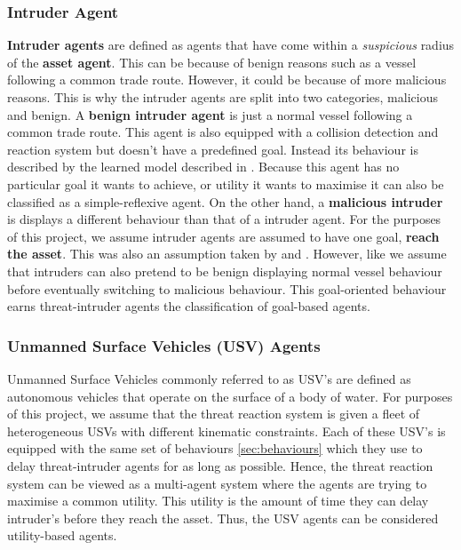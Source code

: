 \documentclass[bsc,frontabs,twoside,singlespacing,parskip,deptreport]{infthesis}     %
\begin{document}
\subsubsection{Intruder Agent}
\label{def:intruder}
\textbf{Intruder agents} are defined as agents that have come within a \textit{suspicious} radius of the \textbf{asset agent}. This can be because of benign reasons such as a vessel following a common trade route. However, it could be because of more malicious reasons. This is why the intruder agents are split into two categories, malicious and benign. A \textbf{benign intruder agent} is just a normal vessel following a common trade route. This agent is also equipped with a collision detection and reaction system but doesn't have a predefined goal. Instead its behaviour is described by the learned model described in . Because this agent has no particular goal it wants to achieve, or utility it wants to maximise it can also be classified as a simple-reflexive agent. On the other hand, a \textbf{malicious intruder} is displays a different behaviour than that of a \nonthreat intruder agent. For the purposes of this project, we assume intruder agents are assumed to have one goal, \textbf{reach the asset}. This was also an assumption taken by \citet{raboin2013model} and \citet{moundegue2017fields}. However, like \citet{raboin2013model} we assume that intruders can also pretend to be benign displaying normal vessel behaviour before eventually switching to malicious behaviour. This goal-oriented behaviour earns threat-intruder agents the classification of goal-based agents.

\subsubsection{Unmanned Surface Vehicles (USV) Agents}
\label{def:usv}
Unmanned Surface Vehicles commonly referred to as USV's are defined as autonomous vehicles that operate on the surface of a body of water. For purposes of this project, we assume that the threat reaction system is given a fleet of heterogeneous USVs with different kinematic constraints. Each of these USV's is equipped with the same set of behaviours \ref{sec:behaviours} which they use to delay threat-intruder agents for as long as possible. Hence, the threat reaction system can be viewed as a multi-agent system where the agents are trying to maximise a common utility. This utility is the amount of time they can delay intruder's before they reach the asset. Thus, the USV agents can be considered utility-based agents.
\end{document}
